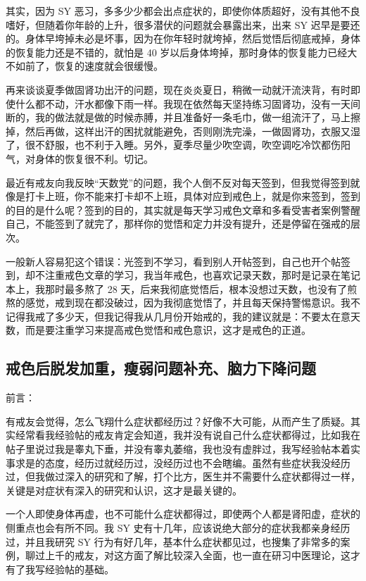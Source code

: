 \documentclass{ctexart}
\begin{document}
其实，因为 SY 恶习，多多少少都会出点症状的，即使你体质超好，没有其他不良嗜好，但随着你年龄的上升，很多潜伏的问题就会暴露出来，出来 SY 迟早是要还的。身体早垮掉未必是坏事，因为在你年轻时就垮掉，然后觉悟后彻底戒掉，身体的恢复能力还是不错的，就怕是 40 岁以后身体垮掉，那时身体的恢复能力已经大不如前了，恢复的速度就会很缓慢。

再来谈谈夏季做固肾功出汗的问题，现在炎炎夏日，稍微一动就汗流浃背，有时即使什么都不动，汗水都像下雨一样。我现在依然每天坚持练习固肾功，没有一天间断的，我的做法就是做的时候赤膊，并且准备好一条毛巾，做一组流汗了，马上擦掉，然后再做，这样出汗的困扰就能避免，否则刚洗完澡，一做固肾功，衣服又湿了，很不舒服，也不利于入睡。另外，夏季尽量少吹空调，吹空调吃冷饮都伤阳气，对身体的恢复很不利。切记。

最近有戒友向我反映“天数党”的问题，我个人倒不反对每天签到，但我觉得签到就像是打卡上班，你不能来打卡却不上班，具体对应到戒色上，就是你来签到，签到的目的是什么呢？签到的目的，其实就是每天学习戒色文章和多看受害者案例警醒自己，不能签到了就完了，那样你的觉悟和定力并没有提升，还是停留在强戒的层次。

一般新人容易犯这个错误：光签到不学习，看到别人开帖签到，自己也开个帖签到，却不注重戒色文章的学习，我当年戒色，也喜欢记录天数，那时是记录在笔记本上，我那时最多熬了 28 天，后来我彻底觉悟后，根本没想过天数，也没有了煎熬的感觉，戒到现在都没破过，因为我彻底觉悟了，并且每天保持警惕意识。我不记得我戒了多少天，但我记得我从几月份开始戒的，我的建议就是：不要太在意天数，而是要注重学习来提高戒色觉悟和戒色意识，这才是戒色的正道。

\subsection{戒色后脱发加重，瘦弱问题补充、脑力下降问题}

前言：

有戒友会觉得，怎么飞翔什么症状都经历过？好像不大可能，从而产生了质疑。其实经常看我经验帖的戒友肯定会知道，我并没有说自己什么症状都得过，比如我在帖子里说过我是睾丸下垂，并没有睾丸萎缩，我也没有虚胖过，我写经验帖本着实事求是的态度，经历过就经历过，没经历过也不会瞎编。虽然有些症状我没经历过，但我做过深入的研究和了解，打个比方，医生并不需要什么症状都得过一样，关键是对症状有深入的研究和认识，这才是最关键的。

一个人即使身体再虚，也不可能什么症状都得过，即使两个人都是肾阳虚，症状的侧重点也会有所不同。我 SY 史有十几年，应该说绝大部分的症状我都亲身经历过，并且我研究 SY 行为有好几年，基本什么症状都见过，也搜集了非常多的案例，聊过上千的戒友，对这方面了解比较深入全面，也一直在研习中医理论，这才有了我写经验帖的基础。
\end{document}
